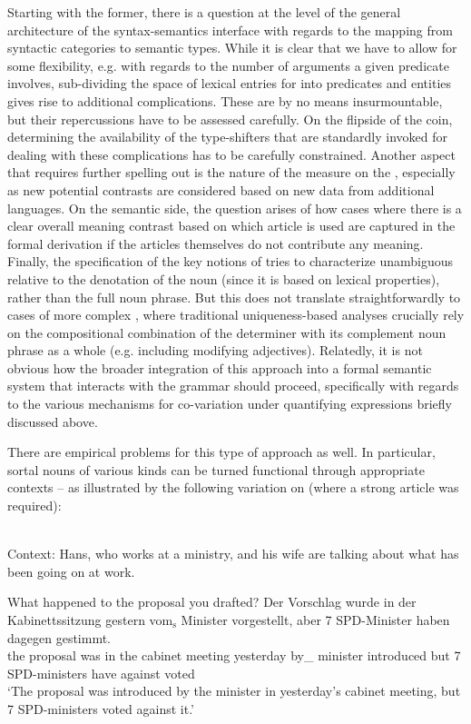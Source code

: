 \documentclass[output=paper
,modfonts
,nonflat]{langscibook}
\begin{document}
Starting with the former, there is a question at the level of the
general architecture of the syntax-semantics interface with regards to
the mapping from syntactic categories to semantic types. While it is
clear that we have to allow for some flexibility, e.g. with regards
to the number of arguments a given predicate involves, sub-dividing
the space of lexical entries for  into predicates and entities
gives rise to additional complications. These are by no means
insurmountable, but their repercussions have to be assessed carefully.
On the flipside of the coin, determining the availability of the
type-shifters that are standardly invoked for dealing with these
complications has to be carefully constrained. Another aspect that
requires further spelling out is the
nature of the measure on the , especially as new
potential contrasts are considered based on new data from additional
languages. On the semantic side, the question arises of how cases where there is a
clear overall meaning contrast based on which article is used are
captured in the formal derivation if the articles themselves do not
contribute any meaning. Finally, the specification of the key notions
of  tries to characterize unambiguous  relative to
the denotation of the noun (since it is based on lexical properties),
rather than the full noun phrase. But this does not translate straightforwardly to
cases of more complex , where traditional uniqueness-based
analyses crucially rely on the compositional combination of the
determiner with its complement noun phrase as a whole (e.g. including
modifying adjectives). Relatedly, it is
not obvious how the broader integration of this approach into a formal
semantic system that interacts with the grammar should proceed,
specifically with regards to the various mechanisms for co-variation
under quantifying expressions briefly discussed above. 

There are empirical problems for this type of approach as well. In particular,
sortal nouns of various kinds can be turned functional through
appropriate contexts -- as illustrated by the following variation on
 (where a strong article
was required):

\begin{exe}
\ex {} \\ Context: Hans, who works at a ministry, and his wife are talking about what has been going on at work.
\begin{xlist}
\ex What happened to the proposal you drafted?\newpage
\ex\gll Der Vorschlag wurde in der Kabinettssitzung gestern {vom$_\text{s}$} {Minister} vorgestellt, aber {7} {SPD-Minister} haben dagegen gestimmt.\label{minister1}\\
the proposal was in the {cabinet meeting} yesterday {by\_\theweak} minister introduced but 7 SPD-ministers have against voted\\
\glt `The proposal was introduced by the minister in yesterday's cabinet meeting, but 7 SPD-ministers voted against it.'
\end{xlist}
\end{exe}
\end{document}

